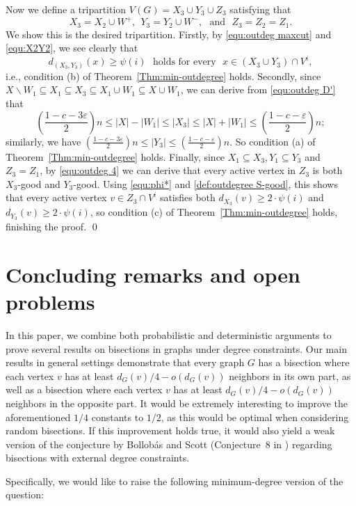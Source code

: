 \documentclass{aic}
\begin{document}
	Now we define a tripartition $V(G)=X_3\cup Y_3\cup Z_3$ satisfying that
	$$X_3=X_2\cup W^+, ~~  Y_3=Y_2\cup W^-, \text{~~and~~} Z_3=Z_2=Z_1.$$
	We show this is the desired tripartition.
	Firstly, by \eqref{equ:outdeg maxcut} and \eqref{equ:X2Y2}, we see clearly that
	$$d_{(X_3,Y_3)}(x)\geq \psi(i) \mbox{ ~holds for every ~} x\in (X_3\cup Y_3)\cap V^i,$$
	i.e., condition (b) of Theorem~\ref{Thm:min-outdegree} holds.
	Secondly, since $X\backslash W_1\subseteq X_1\subseteq X_3\subseteq X_1\cup W_1\subseteq X\cup W_1$,
	we can derive from \eqref{equ:outdeg D'} that
	$$\left(\frac{1-c-3\varepsilon}{2}\right)n\leq |X|-|W_1|\leq |X_3|\leq |X|+|W_1|\le \left(\frac{1-c-\varepsilon}{2}\right)n;$$
	similarly, we have $\left(\frac{1-c-3\varepsilon}{2}\right)n\leq |Y_3|\leq \left(\frac{1-c-\varepsilon}{2}\right)n$.
	So condition (a) of Theorem~\ref{Thm:min-outdegree} holds.
	Finally, since $X_1\subseteq X_3, Y_1\subseteq Y_3$ and $Z_3=Z_1$,
	by \eqref{equ:outdeg 4} we can derive that every active vertex in $Z_3$ is both $X_3$-good and $Y_3$-good.
	Using \eqref{equ:phi*} and \eqref{def:outdegree S-good},
	this shows that every active vertex $v\in Z_3\cap V^i$ satisfies both $d_{X_3}(v)\geq 2\cdot \psi(i)$ and $d_{Y_3}(v)\geq 2\cdot \psi(i)$,
	so condition (c) of Theorem~\ref{Thm:min-outdegree} holds,
	finishing the proof.
	\qed
	
	
	
	
	\section{Concluding remarks and open problems}\label{sec:conclusion}
	\noindent
	In this paper, we combine both probabilistic and deterministic arguments to prove several results on bisections in graphs under degree constraints. Our main results in general settings demonstrate that every graph $G$ has a bisection where each vertex $v$ has at least $d_G(v)/4 - o(d_G(v))$ neighbors in its own part, as well as a bisection where each vertex $v$ has at least $d_G(v)/4 - o(d_G(v))$ neighbors in the opposite part.
	It would be extremely interesting to improve the aforementioned $1/4$ constants to $1/2$, as this would be optimal when considering random bisections.
	If this improvement holds true, it would also yield a weak version of the conjecture by Bollob\'as and Scott (Conjecture~8 in \cite{BS}) regarding bisections with external degree constraints.
	
	Specifically, we would like to raise the following minimum-degree version of the question:
	
\end{document}
